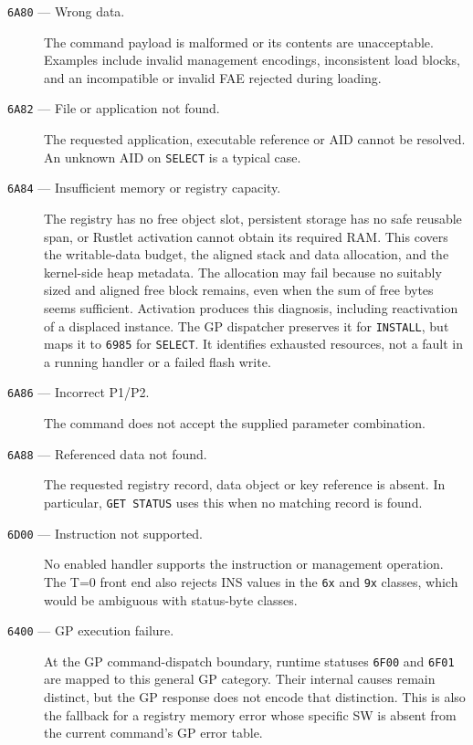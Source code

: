 \begin{description}
\item[\texttt{6A80} --- Wrong data.]
The command payload is malformed or its contents are unacceptable. Examples
include invalid management encodings, inconsistent load blocks, and an
incompatible or invalid FAE rejected during loading.

\item[\texttt{6A82} --- File or application not found.]
The requested application, executable reference or AID cannot be resolved.
An unknown AID on \texttt{SELECT} is a typical case.

\item[\texttt{6A84} --- Insufficient memory or registry capacity.]
The registry has no free object slot, persistent storage has no safe reusable
span, or Rustlet activation cannot obtain its required RAM. This covers the writable-data budget,
the aligned stack and data allocation, and the kernel-side heap metadata. The allocation may fail because no suitably
sized and aligned free block remains, even when the sum of free bytes seems
sufficient. Activation produces this diagnosis, including reactivation of a displaced
instance. The GP dispatcher preserves it for \texttt{INSTALL}, but maps it to
\texttt{6985} for \texttt{SELECT}.
It identifies exhausted resources, not a fault in a running handler or a
failed flash write.

\item[\texttt{6A86} --- Incorrect P1/P2.]
The command does not accept the supplied parameter combination.

\item[\texttt{6A88} --- Referenced data not found.]
The requested registry record, data object or key reference is absent.
In particular, \texttt{GET STATUS} uses this when no matching record is found.

\item[\texttt{6D00} --- Instruction not supported.]
No enabled handler supports the instruction or management operation. The
T=0 front end also rejects INS values in the \texttt{6x} and \texttt{9x}
classes, which would be ambiguous with status-byte classes.

\item[\texttt{6400} --- GP execution failure.]
At the GP command-dispatch boundary, runtime statuses \texttt{6F00} and
\texttt{6F01} are mapped to this general GP category. Their internal causes
remain distinct, but the GP response does not encode that distinction.
This is also the fallback for a registry memory error whose specific SW is
absent from the current command's GP error table.


\end{description}
